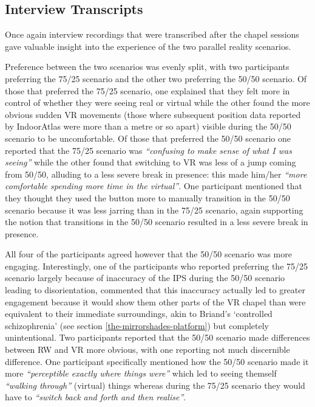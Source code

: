 
\subsection{Interview Transcripts}

Once again interview recordings that were transcribed after the chapel sessions gave valuable insight into the experience of the two parallel reality scenarios.

Preference between the two scenarios was evenly split, with two participants preferring the 75/25 scenario and the other two preferring the 50/50 scenario. Of those that preferred the 75/25 scenario, one explained that they felt more in control of whether they were seeing real or virtual while the other found the more obvious sudden VR movements (those where subsequent position data reported by IndoorAtlas were more than a metre or so apart) visible during the 50/50 scenario to be uncomfortable. Of those that preferred the 50/50 scenario one reported that the 75/25 scenario was \textit{``confusing to make sense of what I was seeing''} while the other found that switching to VR was less of a jump coming from 50/50, alluding to a less severe break in presence: this made him/her \textit{``more comfortable spending more time in the virtual''}. One participant mentioned that they thought they used the button more to manually transition in the 50/50 scenario because it was less jarring than in the 75/25 scenario, again supporting the notion that transitions in the 50/50 scenario resulted in a less severe break in presence.

All four of the participants agreed however that the 50/50 scenario was more engaging. Interestingly, one of the participants who reported preferring the 75/25 scenario largely because of inaccuracy of the IPS during the 50/50 scenario leading to disorientation, commented that this inaccuracy actually led to greater engagement because it would show them other parts of the VR chapel than were equivalent to their immediate surroundings, akin to Briand's `controlled schizophrenia' (see section \ref{the-mirrorshades-platform}) but completely unintentional. Two participants reported that the 50/50 scenario made differences between RW and VR more obvious, with one reporting not much discernible difference. One participant specifically mentioned how the 50/50 scenario made it more \textit{``perceptible exactly where things were''} which led to seeing themself \textit{``walking through''} (virtual) things whereas during the 75/25 scenario they would have to \textit{``switch back and forth and then realise''}.

